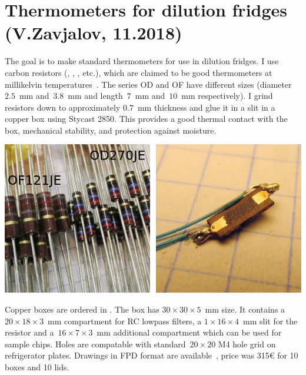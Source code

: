 \documentclass[a4paper]{article}
\begin{document}
\section*{Thermometers for dilution fridges (V.Zavjalov, 11.2018)}

The goal is to make standard thermometers for use in dilution fridges. I
use carbon \Ohmite{} resistors (\OhmiteOFOD{}, ,
,  etc.), which are claimed to be
good thermometers at millikelvin temperatures~\cite{therm_paper}. The
series OD and OF have different sizes (diameter $2.5$~mm and~$3.8$~mm and
length~$7$~mm and~$10$~mm respectively). I grind resistors down to
approximately $0.7$~mm thickness and glue it in a slit in a copper box
using Stycast 2850. This provides a good thermal contact with the box,
mechanical stability, and protection against moisture.

\begin{center}
\includegraphics[width=\linewidth]{img/res.jpg}
\end{center}

Copper boxes are ordered in \SchaefferAG.  The
box has $30\times30\times5$~mm size. It contains a~$20\times18\times3$~mm
compartment for RC lowpass filters, a $1\times16\times4$~mm slit for the
resistor and a~$16\times7\times3$~mm additional compartment which can be
used for sample chips. Holes are compatable with standard~$20\times20$ M4
hole grid on \BlueFors{} refrigerator plates. Drawings in FPD format are
available~\cite{box_drawings}, price was 315\euro{} for 10 boxes and 10
lids.
\end{document}
